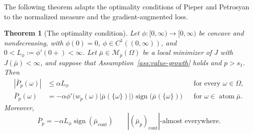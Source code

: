 \documentclass[11pt]{amsart}
\newtheorem{theorem}{Theorem}[section]
\theoremstyle{definition}
\theoremstyle{remark}
\DeclareMathOperator{\atom}{atom}
\DeclareMathOperator{\cont}{cont}
\DeclareMathOperator{\sign}{sign}
\begin{document}
The following theorem adapts the optimality conditions of Pieper and Petrosyan
\cite{pieper2022nonconvex} to the normalized measure and the
gradient-augmented loss.

\begin{theorem}[The optimality condition]
\label{opt_cdt}
Let $\phi:[0,\infty)\to[0,\infty)$ be concave and nondecreasing, with
$\phi(0)=0$, $\phi\in C^1((0,\infty))$, and
$0<L_\phi:=\phi'(0+)<\infty$. Let
$\bar{\mu} \in \mathcal{M}_p(\Omega)$ be a local minimizer of $J$ with
$J(\bar{\mu}) < \infty$, and suppose that
Assumption~\ref{ass:value-growth} holds and $p>s_1$.
Then
\begin{align}
	|\bar P_p(\omega)|&\le\alpha L_\phi
	&& \text{for every } \omega\in\Omega,
	\label{eq:weighted-insertion}\\
	\bar P_p(\omega)
	&=-\alpha\phi'\bigl(w_p(\omega)|\bar\mu(\{\omega\})|\bigr)
	\sign\bigl(\bar\mu(\{\omega\})\bigr)
	&& \text{for }\omega\in\atom\bar\mu.
	\label{eq:weighted-optimality}
\end{align}
Moreover,
\begin{equation}
\label{eq:weighted-cont-equality}
	\bar P_p
	=-\alpha L_\phi\sign(\bar\mu_{\cont})
	\qquad |(\bar\mu_p)_{\cont}|\text{-almost everywhere}.
\end{equation}
\end{theorem}
\end{document}
